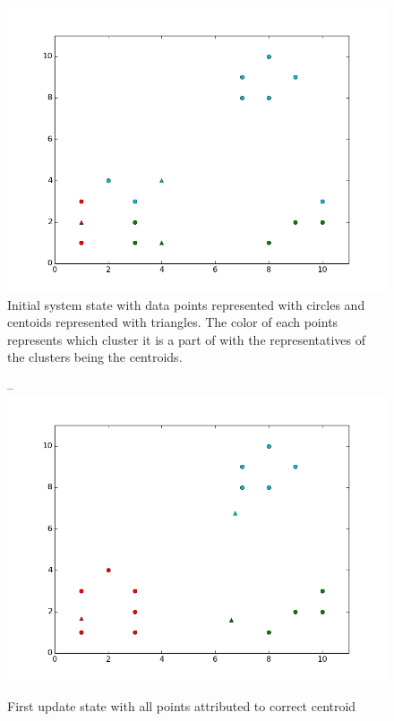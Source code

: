 \documentclass{article}
\begin{document}
\begin{enumerate}
	\begin{figure}[!htb]
	\begin{center}
	  \includegraphics[width=\linewidth]{../images/Cluster1.png}
	  \caption{Initial system state with data points represented with circles and centoids represented with triangles. The color of each points represents which cluster it is a part of with the representatives of the clusters being the centroids.}
	\endminipage\hfill
	\end{center}
	\end{figure}
	\begin{figure}[!htb]--
	  \includegraphics[width=\linewidth]{../images/Cluster2.png}
	  \caption{First update state with all points attributed to correct centroid}

\end{figure}
\end{enumerate}
\end{document}
